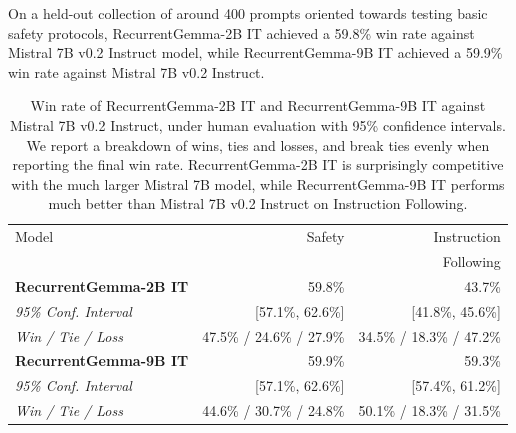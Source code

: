 \documentclass[9pt, a4paper, logo, twocolumn, copyright, nonumbering]{googledeepmind}
\begin{document}
On a held-out collection of around 400 prompts oriented towards testing basic safety protocols, RecurrentGemma-2B IT achieved a 59.8\% win rate against Mistral 7B v0.2 Instruct model, while RecurrentGemma-9B IT achieved a 59.9\% win rate against Mistral 7B v0.2 Instruct.

\begin{table}[t]
\caption{Win rate of RecurrentGemma-2B IT and RecurrentGemma-9B IT against Mistral 7B v0.2 Instruct, under human evaluation with 95\% confidence intervals. We report a breakdown of wins, ties and losses, and break ties evenly when reporting the final win rate. RecurrentGemma-2B IT 
is surprisingly competitive with the much larger Mistral 7B model, while RecurrentGemma-9B IT performs much better than Mistral 7B v0.2 Instruct on Instruction Following.}
\centering
\small
\begin{tabular}{lrr}
\toprule
Model & Safety & Instruction  \\
 &  &  Following \\
\midrule
% 
\textbf{RecurrentGemma-2B IT} & {59.8\%} &  {43.7\%} \\
\tiny{\textit{95\% Conf. Interval}} & \tiny{[57.1\%, 62.6\%]} & \tiny{[41.8\%, 45.6\%]} \vspace{-0.05cm} \\
\tiny{\textit{Win / Tie / Loss}} & \tiny{47.5\% / 24.6\% / 27.9\%} & \tiny{34.5\% / 18.3\% / 47.2\%} \vspace{0.2cm} \\
% 
\textbf{RecurrentGemma-9B IT} & {59.9\%} &  59.3\% \\
\tiny{\textit{95\% Conf. Interval}} & \tiny{[57.1\%, 62.6\%]} & \tiny{[57.4\%, 61.2\%]} \vspace{-0.05cm} \\
\tiny{\textit{Win / Tie / Loss}} & \tiny{44.6\% / 30.7\% / 24.8\%} & \tiny{50.1\% / 18.3\% / 31.5\%} \\
% 
\bottomrule
\end{tabular}
\label{tab:it}
\end{table}
\end{document}
